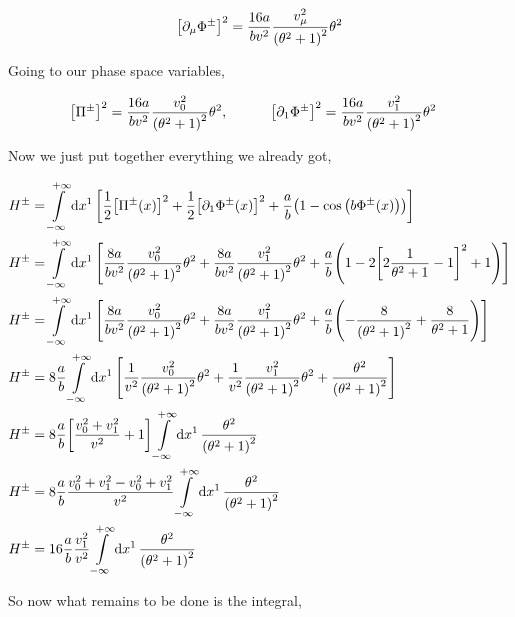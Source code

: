 \begin{align}
    \qty[\partial_\mu\Phi^{\pm}]^2&=\frac{16a}{bv^2}\frac{v_\mu^2}
        {\qty(\theta^2+1)^2}
    \theta^2\nonumber\\
\end{align}

Going to our phase space variables,

\begin{align}
    \qty[\Pi^{\pm}]^2&=\frac{16a}{bv^2}\frac{v_0^2}
        {\qty(\theta^2+1)^2}
    \theta^2,\quad\quad\quad\qty[\partial_1\Phi^{\pm}]^2=\frac{16a}{bv^2}\frac{v_1^2}
    {\qty(\theta^2+1)^2}
    \theta^2\nonumber
\end{align}

Now we just put together everything we already got,

\begin{align}
    H^\pm&=\int\limits_{-\infty}^{+\infty}\dd{x^1}\qty[\frac12\qty[\Pi^\pm\qty(x)]^2
    +\frac12\qty[\partial_1\Phi^\pm\qty(x)]^2
    +\frac ab\qty(1-\cos\qty(b\Phi^\pm\qty(x)))]\nonumber\\
    H^\pm&=\int\limits_{-\infty}^{+\infty}\dd{x^1}\qty[\frac{8a}{bv^2}\frac{v_0^2}
    {\qty(\theta^2+1)^2}\theta^2
    +\frac{8a}{bv^2}\frac{v_1^2}
    {\qty(\theta^2+1)^2}\theta^2
    +\frac ab\qty(1-2\qty[2\frac{1}{\theta^2+1}-1]^2+1)]\nonumber\\
    H^\pm&=\int\limits_{-\infty}^{+\infty}\dd{x^1}\qty[\frac{8a}{bv^2}\frac{v_0^2}
    {\qty(\theta^2+1)^2}\theta^2
    +\frac{8a}{bv^2}\frac{v_1^2}
    {\qty(\theta^2+1)^2}\theta^2
    +\frac ab\qty(-\frac{8}{\qty(\theta^2+1)^2}+\frac{8}{\theta^2+1})]\nonumber\\
    H^\pm&=8\frac ab\int\limits_{-\infty}^{+\infty}\dd{x^1}\qty[\frac{1}{v^2}\frac{v_0^2}
    {\qty(\theta^2+1)^2}\theta^2
    +\frac{1}{v^2}\frac{v_1^2}
    {\qty(\theta^2+1)^2}\theta^2
    +\frac{\theta^2}{\qty(\theta^2+1)^2}]\nonumber\\
    H^\pm&=8\frac ab\qty[\frac{v_0^2+v_1^2}{v^2}+1]\int\limits_{-\infty}^{+\infty}\dd{x^1}\frac{\theta^2}
    {\qty(\theta^2+1)^2}\nonumber\\
    H^\pm&=8\frac ab\frac{v_0^2+v_1^2-v_0^2+v_1^2}{v^2}\int\limits_{-\infty}^{+\infty}\dd{x^1}\frac{\theta^2}
    {\qty(\theta^2+1)^2}\nonumber\\
    H^\pm&=16\frac ab\frac{v_1^2}{v^2}\int\limits_{-\infty}^{+\infty}\dd{x^1}\frac{\theta^2}
    {\qty(\theta^2+1)^2}\nonumber
\end{align}

So now what remains to be done is the integral,


